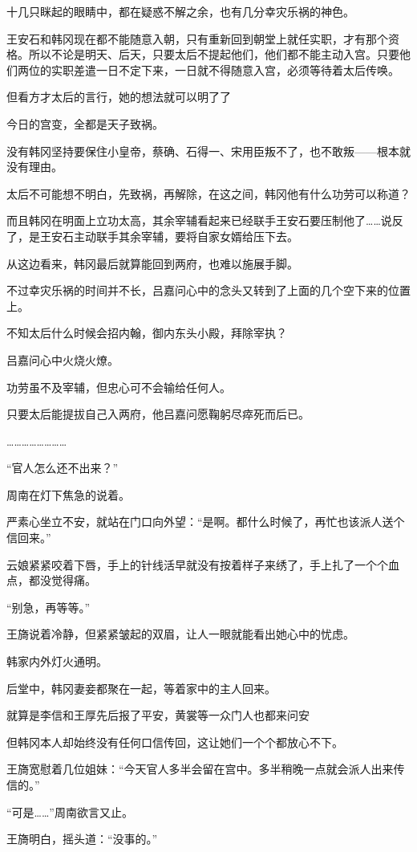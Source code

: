 十几只眯起的眼睛中，都在疑惑不解之余，也有几分幸灾乐祸的神色。

王安石和韩冈现在都不能随意入朝，只有重新回到朝堂上就任实职，才有那个资格。所以不论是明天、后天，只要太后不提起他们，他们都不能主动入宫。只要他们两位的实职差遣一日不定下来，一日就不得随意入宫，必须等待着太后传唤。

但看方才太后的言行，她的想法就可以明了了

今日的宫变，全都是天子致祸。

没有韩冈坚持要保住小皇帝，蔡确、石得一、宋用臣叛不了，也不敢叛——根本就没有理由。

太后不可能想不明白，先致祸，再解除，在这之间，韩冈他有什么功劳可以称道？

而且韩冈在明面上立功太高，其余宰辅看起来已经联手王安石要压制他了……说反了，是王安石主动联手其余宰辅，要将自家女婿给压下去。

从这边看来，韩冈最后就算能回到两府，也难以施展手脚。

不过幸灾乐祸的时间并不长，吕嘉问心中的念头又转到了上面的几个空下来的位置上。

不知太后什么时候会招内翰，御内东头小殿，拜除宰执？

吕嘉问心中火烧火燎。

功劳虽不及宰辅，但忠心可不会输给任何人。

只要太后能提拔自己入两府，他吕嘉问愿鞠躬尽瘁死而后已。

……………………

“官人怎么还不出来？”

周南在灯下焦急的说着。

严素心坐立不安，就站在门口向外望：“是啊。都什么时候了，再忙也该派人送个信回来。”

云娘紧紧咬着下唇，手上的针线活早就没有按着样子来绣了，手上扎了一个个血点，都没觉得痛。

“别急，再等等。”

王旖说着冷静，但紧紧皱起的双眉，让人一眼就能看出她心中的忧虑。

韩家内外灯火通明。

后堂中，韩冈妻妾都聚在一起，等着家中的主人回来。

就算是李信和王厚先后报了平安，黄裳等一众门人也都来问安

但韩冈本人却始终没有任何口信传回，这让她们一个个都放心不下。

王旖宽慰着几位姐妹：“今天官人多半会留在宫中。多半稍晚一点就会派人出来传信的。”

“可是……”周南欲言又止。

王旖明白，摇头道：“没事的。”

